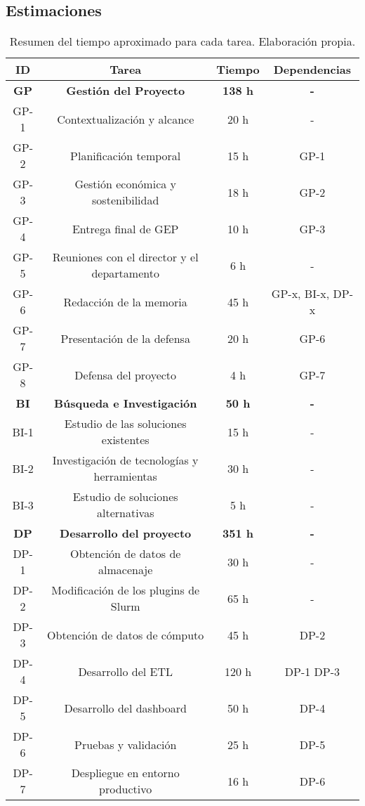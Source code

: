 \subsection{Estimaciones}
\begin{table}[H]
    \centering
    \begin{tabular}{|c|c|c|c|}
        \hline
        \textbf{ID} & \textbf{Tarea} & \textbf{Tiempo} & \textbf{Dependencias} \\
        \hline
        \textbf{GP} & \textbf{Gestión del Proyecto} & \textbf{138 h} & \textbf{-} \\
        \hline
        GP-1 & Contextualización y alcance & 20 h & - \\
        GP-2 & Planificación temporal & 15 h & GP-1 \\
        GP-3 & Gestión económica y sostenibilidad & 18 h & GP-2 \\
        GP-4 & Entrega final de GEP & 10 h & GP-3 \\
        GP-5 & Reuniones con el director y el departamento & 6 h & - \\
        GP-6 & Redacción de la memoria & 45 h & GP-x\footnotemark, BI-x, DP-x\\
        GP-7 & Presentación de la defensa & 20 h & GP-6 \\
        GP-8 & Defensa del proyecto & 4 h & GP-7 \\
        \hline
        \textbf{BI} & \textbf{Búsqueda e Investigación} & \textbf{50 h} & \textbf{-} \\
        \hline
        BI-1 & Estudio de las soluciones existentes & 15 h & - \\
        BI-2 & Investigación de tecnologías y herramientas & 30 h & - \\
        BI-3 & Estudio de soluciones alternativas & 5 h & - \\
        \hline
        \textbf{DP} & \textbf{Desarrollo del proyecto} & \textbf{351 h} & \textbf{-} \\
        \hline
        DP-1 & Obtención de datos de almacenaje & 30 h & - \\
        DP-2 & Modificación de los plugins de Slurm & 65 h & - \\
        DP-3 & Obtención de datos de cómputo & 45 h & DP-2 \\
        DP-4 & Desarrollo del ETL & 120 h & DP-1 DP-3 \\
        DP-5 & Desarrollo del dashboard & 50 h & DP-4 \\
        DP-6 & Pruebas y validación & 25 h & DP-5 \\
        DP-7 & Despliegue en entorno productivo & 16 h & DP-6 \\
        \hline
    \end{tabular}
    \caption{Resumen del tiempo aproximado para cada tarea. Elaboración propia.}
    \label{tab:estimaciones}
\end{table}

\